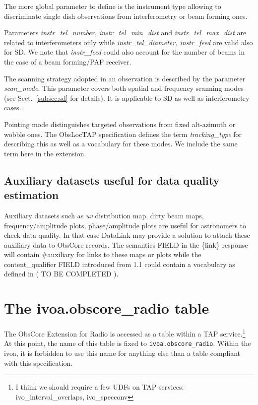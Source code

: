\documentclass[11pt,a4paper]{ivoa}
\begin{document}
The more global parameter to define is the instrument type allowing to discriminate single dish observations from interferometry or beam forming ones.

Parameters \emph{instr\_tel\_number, instr\_tel\_min\_dist} and  \emph{instr\_tel\_max\_dist} are related to interferometers only while 
\emph{instr\_tel\_diameter, instr\_feed } are valid also for SD.
We note that \emph{instr\_feed} could also  account for the number of beams in the case of a beam forming/PAF receiver.

The scanning strategy adopted in an observation is described by the parameter \emph{scan\_mode}. This parameter covers both spatial
and frequency scanning modes (see Sect.~\ref{subsec:sd} for details).
It is applicable to  SD as well as  interferometry cases.

Pointing mode distinguishes targeted observations from  fixed alt-azimuth or wobble ones. The ObsLocTAP specification \citep{2021ivoa.spec.0724S} defines the term \emph{tracking\_type} for describing this as well as a  vocabulary for these modes. 
We include the same term here in the extension.

\subsection{Auxiliary datasets useful for data quality estimation}

Auxiliary datasets such as  \emph{uv} distribution map, dirty beam maps, frequency/amplitude plots, phase/amplitude plots are useful for astronomers to check data quality.
In that case DataLink \citep{2023ivoa.spec.1215B} may provide a solution to attach these auxiliary data to ObsCore records. The semantics FIELD in the \{link\}
response  will contain \#auxiliary  for links to these maps or plots while  the content\_qualifier FIELD introduced from 1.1  could contain a vocabulary as defined in ( TO BE COMPLETED ).


\section{The ivoa.obscore\_radio table}
\label{sec:implementation}
The ObsCore Extension for Radio is accessed as a table within a TAP
\citep{2019ivoa.spec.0927D} service.\footnote{I think we should require a
few UDFs on TAP services: ivo\_interval\_overlaps, ivo\_specconv}  At this
point, the name of this table is fixed to \verb|ivoa.obscore_radio|.
Within the ivoa, it is forbidden to use this name for anything else than a table compliant
with this specification.
\end{document}
